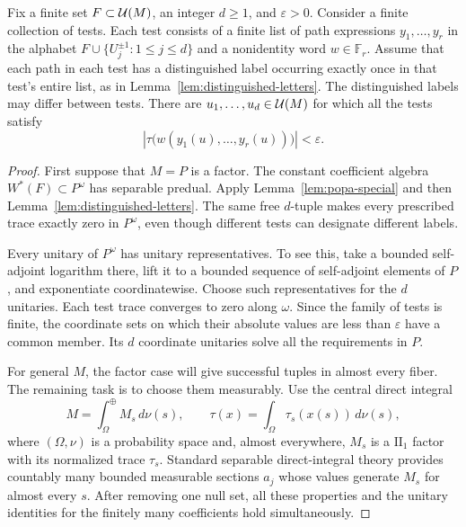 \begin{lemma}\label{lem:finite-path-tests}
Fix a finite set $F\subset\mathcal U(M)$, an integer $d\geq1$, and
$\varepsilon>0$.  Consider a finite collection of tests.  Each test
consists of a finite list of path expressions $y_1,\ldots,y_r$ in the
alphabet $F\cup\{U_j^{\pm1}:1\leq j\leq d\}$ and a nonidentity word
$w\in\mathbb F_r$.  Assume that each path in each test has a
distinguished label occurring exactly once in that test's entire list,
as in Lemma~\ref{lem:distinguished-letters}.  The distinguished labels
may differ between tests.  There are $u_1,\ldots,u_d\in\mathcal U(M)$ for which
all the tests satisfy
\[
 \left|\tau\bigl(w(y_1(u),\ldots,y_r(u))\bigr)\right|
 <\varepsilon.
\]
\end{lemma}

\begin{proof}
First suppose that $M=P$ is a factor.  The constant coefficient algebra
$W^*(F)\subset P^\omega$ has separable predual.  Apply
Lemma~\ref{lem:popa-special} and then
Lemma~\ref{lem:distinguished-letters}.  The same free $d$-tuple makes
every prescribed trace exactly zero in $P^\omega$, even though different
tests can designate different labels.

Every unitary of $P^\omega$ has unitary representatives.  To see this,
take a bounded self-adjoint logarithm there, lift it to a bounded
sequence of self-adjoint elements of $P$, and exponentiate coordinatewise.
Choose such representatives for the $d$ unitaries.  Each test trace
converges to zero along $\omega$.  Since the family of tests is finite,
the coordinate sets on which their absolute values are less than
$\varepsilon$ have a common member.  Its $d$ coordinate unitaries solve
all the requirements in $P$.

For general $M$, the factor case will give successful tuples in
almost every fiber.  The remaining task is to choose them measurably.
Use the central direct integral
\cite[Sections~III.1.6 and III.5.1]{Blackadar2006}
\[
 M=\int_\Omega^\oplus M_s\,d\nu(s),
 \qquad
 \tau(x)=\int_\Omega\tau_s(x(s))\,d\nu(s),
\]
where $(\Omega,\nu)$ is a probability space and, almost everywhere,
$M_s$ is a $\mathrm{II}_1$ factor with its normalized trace $\tau_s$.
Standard separable direct-integral theory provides countably many
bounded measurable sections $a_j$ whose values generate $M_s$ for
almost every $s$.  After removing one null set, all these properties
and the unitary identities for the finitely many coefficients hold
simultaneously.


\end{proof}
